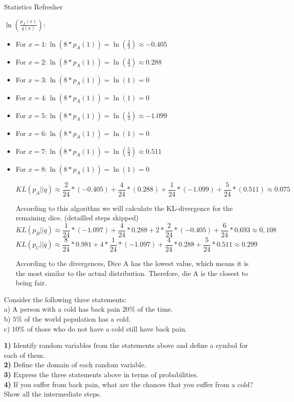 \documentclass[
	english,
        solution=true
	]{tudaexercise}
\begin{document}
\begin{task}[points=15]{Statistics Refresher}
\begin{subtask}[points=4,title=Unbiased Estimators and KL-Divergence]
\begin{solution}
\begin{enumerate}
$\ln(\frac{p_A(x)}{q(x)})$:
\begin{itemize}
    \item For $x=1: \ln(8*p_A(1))=\ln(\frac{2}{3})\approx -0.405$
    \item For $x=2: \ln(8*p_A(1))=\ln(\frac{4}{3})\approx 0.288$
    \item For $x=3: \ln(8*p_A(1))=\ln(1)=0$
    \item For $x=4: \ln(8*p_A(1))=\ln(1)=0$
    \item For $x=5: \ln(8*p_A(1))=\ln(\frac{1}{3})\approx -1.099$
    \item For $x=6: \ln(8*p_A(1))=\ln(1)=0$
    \item For $x=7: \ln(8*p_A(1))=\ln(\frac{5}{3})\approx 0.511$
    \item For $x=8: \ln(8*p_A(1))=\ln(1)=0$

\[KL(p_A||q) \approx \frac{2}{24}*(-0.405)+\frac{4}{24}*(0.288)+\frac{1}{24}*(-1.099)+\frac{5}{24}*(0.511)\approx 0.075\]

According to this algorithm we will calculate the KL-divergence for the remaining dice. (detailled steps skipped)
\[KL(p_B||q)\approx \frac{1}{24}*(-1.097)+\frac{4}{24}*0.288+2*\frac{2}{24}*(-0.405)+\frac{6}{24}*0.693\approx 0,108\]
\[KL(p_C||q)\approx \frac{8}{24}*0.981+4*\frac{1}{24}*(-1.097)+\frac{4}{24}*0.288+\frac{5}{24}*0.511\approx0.299\]

According to the divergences, Dice A has the lowest value, which means it is the most similar to the actual distribution. Therefore, die A is the closest to being fair.
\end{itemize}
    
\end{enumerate}

\end{solution}
\end{subtask}


\begin{subtask}[points=7, title=Conditional Probability]
Consider the following three statements:
\\
a) A person with a cold has back pain $20\%$ of the time. 
\\
b) $5\%$ of the world population has a cold.
 \\
c) $10\%$ of those who do not have a cold still have back pain.

\textbf{1)} Identify random variables from the statements above and define a symbol for each of them.\\
\textbf{2)} Define the domain of each random variable.\\
\textbf{3)} Express the three statements above in terms of probabilities.\\
\textbf{4)} If you suffer from back pain, what are the chances that you suffer from a cold? Show all the intermediate steps.


\end{subtask}
\end{task}
\end{document}
